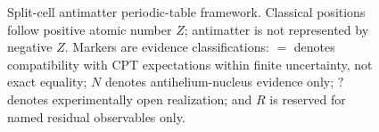 \begin{landscape}
\begin{figure}[p]
\centering

\caption{Split-cell antimatter periodic-table framework. Classical positions follow positive atomic number $Z$; antimatter is not represented by negative $Z$. Markers are evidence classifications: $=$ denotes compatibility with CPT expectations within finite uncertainty, not exact equality; $N$ denotes antihelium-nucleus evidence only; $?$ denotes experimentally open realization; and $R$ is reserved for named residual observables only.}
\label{fig:ptable-split}
\end{figure}
\end{landscape}
